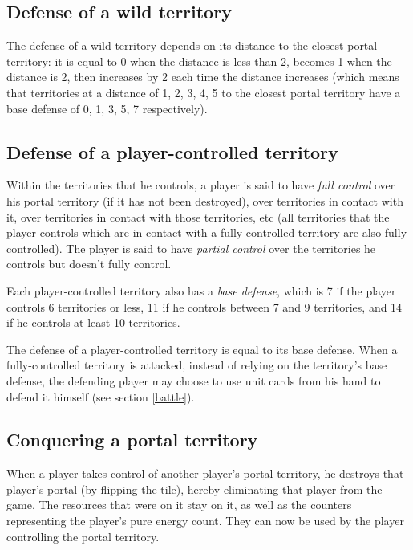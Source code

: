 \documentclass[a4paper]{article}
\begin{document}
    \subsection{Defense of a wild territory}
        The defense of a wild territory depends on its distance
        to the closest portal territory:
        it is equal to 0  when the distance is less than 2,
        becomes 1 when the distance is 2,
        then increases by 2 each time the distance increases
        (which means that territories at a distance of 1, 2, 3, 4, 5
        to the closest portal territory have a base defense of  0, 1, 3, 5, 7
        respectively).
        
    \subsection{Defense of a player-controlled territory}
        \label{base-defense}
        Within the territories that he controls, a player is said to have
        \textit{full control} over his portal territory (if it has not been destroyed),
        over territories in contact with it,
        over territories in contact with those territories, etc
        (all territories that the player controls which are in contact with a fully controlled
        territory are also fully controlled).
        The player is said to have \textit{partial control} over the territories
        he controls but doesn't fully control.
        
        Each player-controlled territory also has a \textit{base defense},
        which is 7 if the player controls 6 territories or less,
        11 if he controls between 7 and 9 territories,
        and 14 if he controls at least 10 territories.
        
        The defense of a player-controlled territory is equal to its base defense.
        When a fully-controlled territory is attacked,
        instead of relying on the territory's base defense,
        the defending player may choose to use unit cards from his hand to defend it
        himself (see section \ref{battle}).
        
    \subsection{Conquering a portal territory}
        When a player takes control of another player's portal territory,
        he destroys that player's portal (by flipping the tile),
        hereby eliminating that player from the game.
        The resources that were on it stay on it,
        as well as the counters representing the player's pure energy count.
        They can now be used by the player controlling the portal territory.
        
\end{document}
